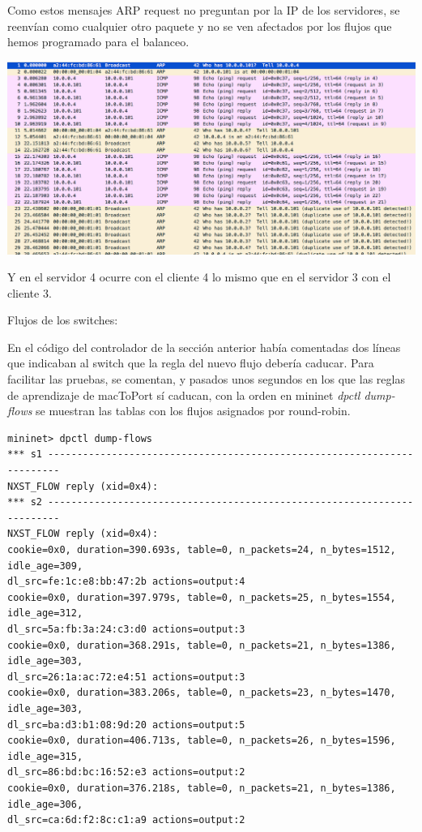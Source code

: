 \documentclass{article}
\begin{document}
Como estos mensajes ARP request no preguntan por la IP de los servidores, se reenvían como cualquier otro paquete y no se ven afectados por los flujos que hemos programado para el balanceo.

\hfill

\begin{center}
	\includegraphics[scale=0.5]{images/srv4.png}
\end{center}

Y en el servidor 4 ocurre con el cliente 4 lo mismo que en el servidor 3 con el cliente 3.


\hfill


\hfill

Flujos de los switches:

\hfill

En el código del controlador de la sección anterior había comentadas dos líneas que indicaban al switch que la regla del nuevo flujo debería caducar. Para facilitar las pruebas, se comentan, y pasados unos segundos en los que las reglas de aprendizaje de macToPort sí caducan, con la orden en mininet \textit{dpctl dump-flows} se muestran las tablas con los flujos asignados por round-robin.

\hfill



\begin{Verbatim}
mininet> dpctl dump-flows
*** s1 ------------------------------------------------------------------------
NXST_FLOW reply (xid=0x4):
*** s2 ------------------------------------------------------------------------
NXST_FLOW reply (xid=0x4):
cookie=0x0, duration=390.693s, table=0, n_packets=24, n_bytes=1512, idle_age=309,
dl_src=fe:1c:e8:bb:47:2b actions=output:4
cookie=0x0, duration=397.979s, table=0, n_packets=25, n_bytes=1554, idle_age=312,
dl_src=5a:fb:3a:24:c3:d0 actions=output:3
cookie=0x0, duration=368.291s, table=0, n_packets=21, n_bytes=1386, idle_age=303,
dl_src=26:1a:ac:72:e4:51 actions=output:3
cookie=0x0, duration=383.206s, table=0, n_packets=23, n_bytes=1470, idle_age=303,
dl_src=ba:d3:b1:08:9d:20 actions=output:5
cookie=0x0, duration=406.713s, table=0, n_packets=26, n_bytes=1596, idle_age=315,
dl_src=86:bd:bc:16:52:e3 actions=output:2
cookie=0x0, duration=376.218s, table=0, n_packets=21, n_bytes=1386, idle_age=306,
dl_src=ca:6d:f2:8c:c1:a9 actions=output:2
\end{Verbatim}
\end{document}
